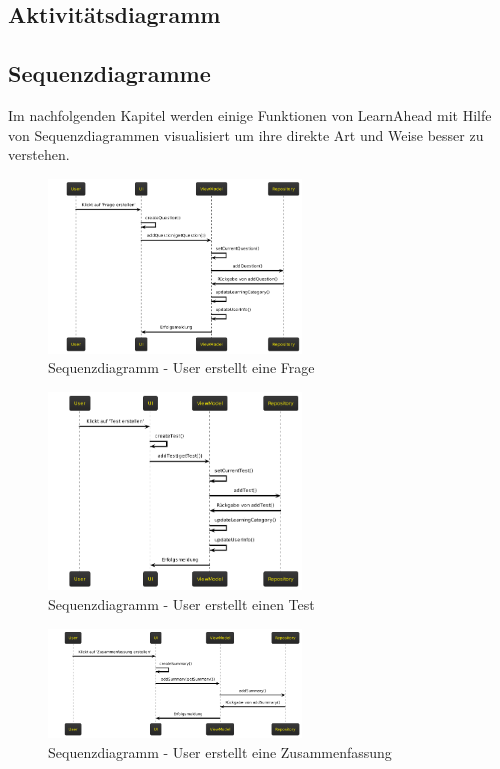 \subsection{Aktivitätsdiagramm}
\subsection{Sequenzdiagramme}
Im nachfolgenden Kapitel werden einige Funktionen von LearnAhead mit Hilfe von Sequenzdiagrammen visualisiert um ihre direkte Art und Weise besser zu verstehen.\\
\begin{figure}[h]
    \centering
    \includegraphics[width=0.6\textwidth]{images/diagramme/sequenzdiagramme/user_erstellt_frage.png}
    \caption{Sequenzdiagramm - User erstellt eine Frage}
    \label{fig:sequenz_user_erstellt_frage}
\end{figure} 
\begin{figure}[h]
    \centering
    \includegraphics[width=0.6\textwidth]{images/diagramme/sequenzdiagramme/user_erstellt_test.png}
    \caption{Sequenzdiagramm - User erstellt einen Test}
    \label{fig:sequenz_user_erstellt_test}
\end{figure} 
\begin{figure}[h]
    \centering
    \includegraphics[width=0.6\textwidth]{images/diagramme/sequenzdiagramme/user_erstellt_zusammenfassung.png}
    \caption{Sequenzdiagramm - User erstellt eine Zusammenfassung}
    \label{fig:sequenz_user_erstellt_zusammenfassung}
\end{figure} 
